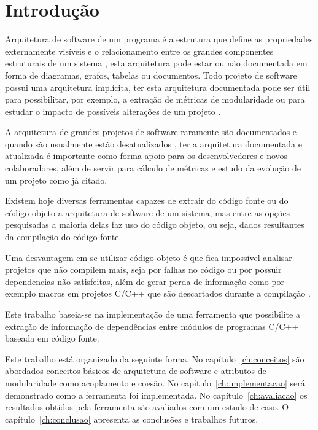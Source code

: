 \chapter{Introdução}

Arquitetura de software de um programa é a estrutura que define as propriedades
externamente visíveis e o relacionamento entre os grandes componentes
estruturais de um sistema \cite{engenhariaDeSoftwarePressman}, esta arquitetura
pode estar ou não documentada em forma de diagramas, grafos, tabelas ou documentos.
Todo projeto de software possui uma arquitetura implícita, ter esta arquitetura
documentada pode ser útil para possibilitar, por exemplo, a extração de
métricas de modularidade ou para estudar o impacto de possíveis alterações de
um projeto \cite{mata26-terceiro-projeto-piloto}.

A arquitetura de grandes projetos de software raramente são documentados e
quando são usualmente estão desatualizados
\cite{sourceVersusObjectCodeExtraction}, ter a arquitetura documentada e
atualizada é importante como forma apoio para os desenvolvedores e novos
colaboradores, além de servir para cálculo de métricas e estudo da evolução de
um projeto como já citado.

Existem hoje diversas ferramentas capazes de extrair do código fonte ou do
código objeto a arquitetura de software de um sistema, mas entre as opções
pesquisadas \cite{sourceVersusObjectCodeExtraction} a maioria delas faz uso do
código objeto, ou seja, dados resultantes da compilação do código fonte.

Uma desvantagem em se utilizar código objeto é que fica impossível
analisar projetos que não compilem mais, seja por falhas no código ou por
possuir dependencias não satisfeitas, além de gerar perda de informação como por
exemplo macros em projetos C/C++ que são descartados durante a
compilação \cite{sourceVersusObjectCodeExtraction}.

Este trabalho baseia-se na implementação de uma ferramenta que possibilite a
extração de informação de dependências entre módulos de programas C/C++ baseada
em código fonte.

Este trabalho está organizado da seguinte forma. No capítulo~\ref{ch:conceitos}
são abordados conceitos básicos de arquitetura de software e atributos de
modularidade como acoplamento e coesão. No capítulo~\ref{ch:implementacao} será
demonstrado como a ferramenta foi implementada. No capítulo~\ref{ch:avaliacao}
os resultados obtidos pela ferramenta são avaliados com um estudo de caso. O
capítulo~\ref{ch:conclusao} apresenta as conclusões e trabalhos futuros.


